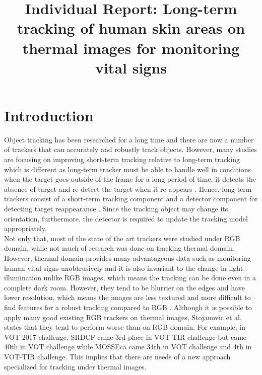 \documentclass[conference]{IEEEtran}
\begin{document}
\title{Individual Report: Long-term tracking of human skin areas on thermal images for monitoring vital signs\\}

\author{

}

\maketitle


\section{Introduction}
Object tracking has been researched for a long time and there are now a number of trackers that can accurately and robustly track objects. However, many studies are focusing on improving short-term tracking relative to long-term tracking which is different as long-term tracker must be able to handle well in conditions when the target goes outside of the frame for a long period of time, it detects the absence of target and re-detect the target when it re-appears \cite{b12}. Hence, long-term trackers consist of a short-term tracking component and a detector component for detecting target reappearance \cite{b12}. Since the tracking object may change its orientation, furthermore, the detector is required to update the tracking model appropriately.\\

Not only that, most of the state of the art trackers were studied under RGB domain, while not much of research was done on tracking thermal domain. However, thermal domain provides many advantageous data such as monitoring human vital signs unobtrusively and it is also invariant to the change in light illumination unlike RGB images, which means the tracking can be done even in a complete dark room. However, they tend to be blurrier on the edges and have lower resolution, which means the images are less textured and more difficult to find features for a robust tracking compared to RGB \cite{b3}. Although it is possible to apply many good existing RGB trackers on thermal images, Stojanovic et al. \cite{b10} states that they tend to perform worse than on RGB domain. For example, in VOT 2017 challenge, SRDCF came 3rd place in VOT-TIR challenge but came 40th in VOT challenge while MOSSEca came 34th in VOT challenge and 4th in VOT-TIR challenge\cite{b11}. This implies that there are needs of a new approach specialized for tracking under thermal images.\\
\end{document}
